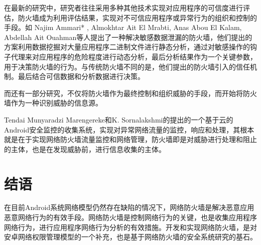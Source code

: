 \documentclass{article}
\begin{document}
在最新的研究中，研究者往往采用多种其他技术实现对应用程序的可信度进行评估，防火墙成为利用评估结果，实现对不可信应用程序或异常行为的组织和控制的手段。如
Najim Ammari* , Almokhtar Ait El Mrabti, Anas Abou El Kalam, Abdellah Ait Ouahman等人提出了一种解决敏感数据泄漏的防火墙，他们提出的方案利用数据挖掘对大量应用程序二进制文件进行静态分析，通过对敏感操作的钩子代理来对应用程序的危险程度进行动态分析，最后分析结果作为一个关键参数，用于决策防火墙的行为。与传统防火墙不同的是，他们提出的防火墙引入的信任机制。最后结合可信数据和分析数据进行决策。


而还有一部分研究，不仅将防火墙作为最终控制和组织威胁的手段，而开始将防火墙作为一种识别威胁的信息源。

Tendai Munyaradzi Marengereke和K. Sornalakshmi的提出的一个基于云的Android安全监控的收集系统，实现对异常网络流量的监控，响应和处理，其根本就是在于实现网络防火墙流量监控和网络管理，防火墙即是对威胁进行处理和阻止的主体，也是在发现威胁前，进行信息收集的主体。




\section{结语}

在目前Android系统网络模型仍然存在缺陷的情况下，网络防火墙是解决恶意应用恶意网络行为的有效手段。网络防火墙是控制网络行为的关键，也是收集应用程序网络行为，进行应用程序网络行为分析的有效措施。开发和实现网络防火墙，是对安卓网络权限管理模型的一个补充，也是基于网络防火墙的安全系统研究的基石。
\end{document}
